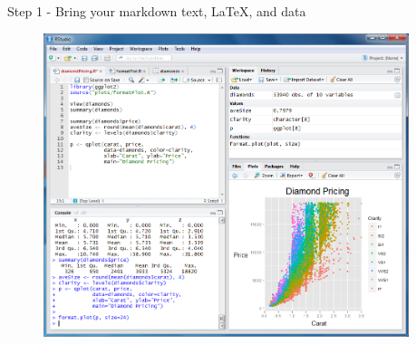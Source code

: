 \documentclass[final]{beamer}
\begin{document}
\begin{frame}[fragile]
\begin{columns}[t]
\begin{column}{0.31\linewidth}
\begin{minipage}[t][1.000\textheight]{\linewidth}
\vspace{0ex}
\begin{block}{Step 1 - Bring your markdown text, LaTeX, and data}
\vspace{0ex}
\begin{figure}
\includegraphics[width=\linewidth]{images/RStudio-Screenshot.png}
\end{figure}
\vspace{0ex}
\end{block}
\vfill

\end{minipage}
\end{column}%


\begin{column}{0.31\linewidth}
\begin{minipage}[t][.955\textheight]{\linewidth} 


\end{minipage}
\end{column}
\end{columns}
\end{frame}
\end{document}
